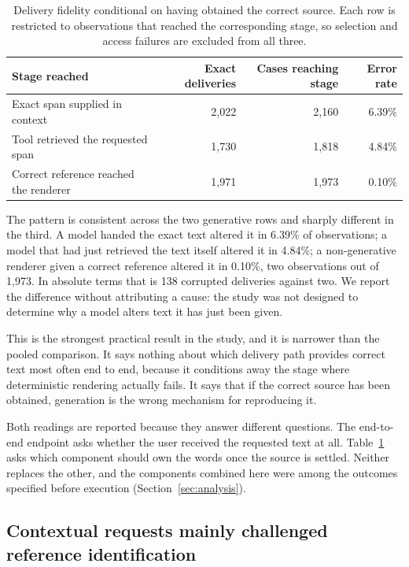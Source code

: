 \documentclass[11pt]{article}
\begin{document}
\begin{table}[htbp]
\centering
\small
\begin{tabular}{lrrr}
\toprule
Stage reached & Exact deliveries & Cases reaching stage & Error rate \\
\midrule
Exact span supplied in context & 2,022 & 2,160 & 6.39\% \\
Tool retrieved the requested span & 1,730 & 1,818 & 4.84\% \\
Correct reference reached the renderer & 1,971 & 1,973 & 0.10\% \\
\bottomrule
\end{tabular}
\caption{Delivery fidelity conditional on having obtained the correct source.
Each row is restricted to observations that reached the corresponding stage, so
selection and access failures are excluded from all three.}
\label{tab:rendering}
\end{table}

The pattern is consistent across the two generative rows and sharply different
in the third. A model handed the exact text altered it in 6.39\% of
observations; a model that had just retrieved the text itself altered it in
4.84\%; a non-generative renderer given a correct reference altered it in
0.10\%, two observations out of 1,973. In absolute terms that is 138 corrupted
deliveries against two. We report the difference without attributing a cause:
the study was not designed to determine why a model alters text it has just
been given.

This is the strongest practical result in the study, and it is narrower than the
pooled comparison. It says nothing about which delivery path provides correct
text most often end to end, because it conditions away the stage where
deterministic rendering actually fails. It says that if the correct source has
been obtained, generation is the wrong mechanism for reproducing it.

Both readings are reported because they answer different questions. The
end-to-end endpoint asks whether the user received the requested text at all.
Table~\ref{tab:rendering} asks which component should own the words once the
source is settled. Neither replaces the other, and the components combined here
were among the outcomes specified before execution
(Section~\ref{sec:analysis}).

\subsection{Contextual requests mainly challenged reference identification}
\end{document}
